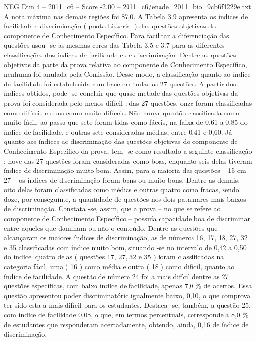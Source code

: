 \begin{textsample}{NEG Dim 4 – 2011\_c6 – Score -2.00 – 2011\_c6/enade\_2011\_bio\_9cb6f4229e.txt}
A nota máxima nas demais regiões foi 87,0.
A Tabela 3.9 apresenta os índices de facilidade e discriminação ( ponto bisserial ) das questões objetivas do componente de Conhecimento Específico.
Para facilitar a diferenciação das questões usou -se as mesmas cores das Tabela 3.5 e 3.7 para as diferentes classificações dos índices de facilidade e de discriminação.
Dentre as questões objetivas da parte da prova relativa ao componente de Conhecimento Específico, nenhuma foi anulada pela Comissão.
Desse modo, a classificação quanto ao índice de facilidade foi estabelecida com base em todas as 27 questões.
A partir dos índices obtidos, pode -se concluir que quase metade das questões objetivas da prova foi considerada pelo menos difícil : das 27 questões, onze foram classificadas como difíceis e duas como muito difíceis.
Não houve questão classificada como muito fácil, ao passo que sete foram tidas como fáceis, na faixa de 0,61 a 0,85 do índice de facilidade, e outras sete consideradas médias, entre 0,41 e 0,60.
Já quanto aos índices de discriminação das questões objetivas do componente de Conhecimento Específico da prova, tem -se como resultado a seguinte classificação : nove das 27 questões foram consideradas como boas, enquanto seis delas tiveram índice de discriminação muito bom.
Assim, para a maioria das questões – 15 em 27 – os índices de discriminação foram bons ou muito bons.
Dentre as demais, oito delas foram classificadas como médias e outras quatro como fracas, sendo doze, por conseguinte, a quantidade de questões nos dois patamares mais baixos de discriminação.
Constata -se, assim, que a prova – no que se refere ao componente de Conhecimento Específico – possuía capacidade boa de discriminar entre aqueles que dominam ou não o conteúdo.
Dentre as questões que alcançaram os maiores índices de discriminação, as de números 16, 17, 18, 27, 32 e 35 classificadas com índice muito bom, situando -se no intervalo de 0,42 a 0,50 do índice, quatro delas ( questões 17, 27, 32 e 35 ) foram classificadas na categoria fácil, uma ( 16 ) como média e outra ( 18 ) como difícil, quanto ao índice de facilidade.
A questão de número 24 foi a mais difícil dentre as 27 questões específicas, com baixo índice de facilidade, apenas 7,0 \% de acertos.
Essa questão apresentou poder discriminatório igualmente baixo, 0,10, o que comprova ter sido esta a mais difícil para os estudantes.
Destaca -se, também, a questão 25, com índice de facilidade 0,08, o que, em termos percentuais, corresponde a 8,0 \% de estudantes que responderam acertadamente, obtendo, ainda, 0,16 de índice de discriminação.

\end{textsample}
